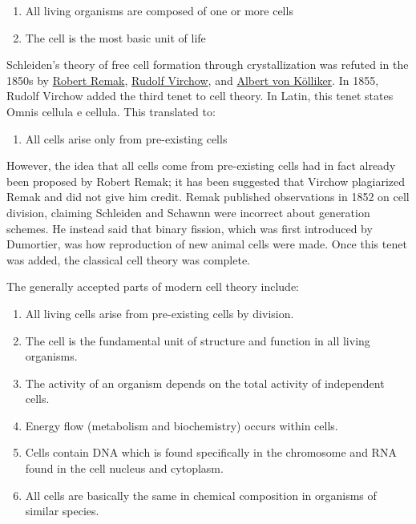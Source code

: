 \begin{enumerate}
\def\labelenumi{\arabic{enumi}.}
\tightlist
\item
  All living organisms are composed of one or more cells
\item
  The cell is the most basic unit of life
\end{enumerate}

Schleiden's theory of free cell formation through crystallization was refuted in the 1850s by \href{https://en.wikipedia.org/wiki/Robert_Remak}{Robert Remak}, \href{https://en.wikipedia.org/wiki/Rudolf_Virchow}{Rudolf Virchow}, and \href{https://en.wikipedia.org/wiki/Albert_von_Kölliker}{Albert von Kölliker}. In 1855, Rudolf Virchow added the third tenet to cell theory. In Latin, this tenet states Omnis cellula e cellula. This translated to:

\begin{enumerate}
\def\labelenumi{\arabic{enumi}.}
\setcounter{enumi}{2}
\tightlist
\item
  All cells arise only from pre-existing cells
\end{enumerate}

However, the idea that all cells come from pre-existing cells had in fact already been proposed by Robert Remak; it has been suggested that Virchow plagiarized Remak and did not give him credit. Remak published observations in 1852 on cell division, claiming Schleiden and Schawnn were incorrect about generation schemes. He instead said that binary fission, which was first introduced by Dumortier, was how reproduction of new animal cells were made. Once this tenet was added, the classical cell theory was complete.

The generally accepted parts of modern cell theory include:

\begin{enumerate}
\def\labelenumi{\arabic{enumi}.}
\tightlist
\item
  All living cells arise from pre-existing cells by division.
\item
  The cell is the fundamental unit of structure and function in all living organisms.
\item
  The activity of an organism depends on the total activity of independent cells.
\item
  Energy flow (metabolism and biochemistry) occurs within cells.
\item
  Cells contain DNA which is found specifically in the chromosome and RNA found in the cell nucleus and cytoplasm.
\item
  All cells are basically the same in chemical composition in organisms of similar species.
\end{enumerate}

